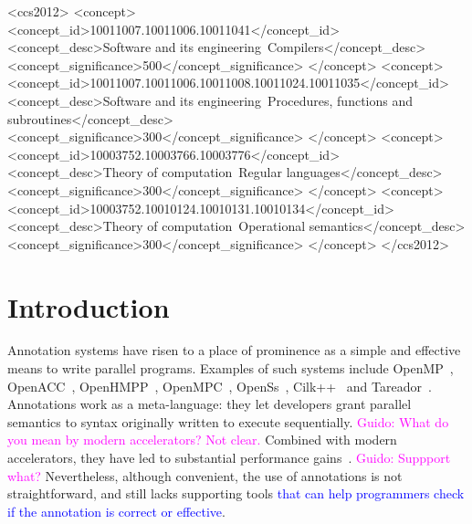 \documentclass[sigplan,10pt,review,anonymous]{acmart}
\newcommand{\guido}[1]{\noindent\textcolor{magenta}{Guido: {#1}}}
\newcommand{\new}[1]{\noindent\textcolor{blue}{ {#1}}}
\newcommand{\guido}[1]{}
\newcommand{\new}[1]{#1}
\begin{document}
 \begin{CCSXML}
<ccs2012>
<concept>
<concept_id>10011007.10011006.10011041</concept_id>
<concept_desc>Software and its engineering~Compilers</concept_desc>
<concept_significance>500</concept_significance>
</concept>
<concept>
<concept_id>10011007.10011006.10011008.10011024.10011035</concept_id>
<concept_desc>Software and its engineering~Procedures, functions and subroutines</concept_desc>
<concept_significance>300</concept_significance>
</concept>
<concept>
<concept_id>10003752.10003766.10003776</concept_id>
<concept_desc>Theory of computation~Regular languages</concept_desc>
<concept_significance>300</concept_significance>
</concept>
<concept>
<concept_id>10003752.10010124.10010131.10010134</concept_id>
<concept_desc>Theory of computation~Operational semantics</concept_desc>
<concept_significance>300</concept_significance>
</concept>
</ccs2012>
\end{CCSXML}



\maketitle

\section{Introduction}
\label{sec:intro}

Annotation systems have risen to a place of prominence as a simple and
effective means to write parallel programs.
Examples of such systems include OpenMP~\cite{JaegerCP15},
OpenACC~\cite{OpenACC20}, OpenHMPP~\cite{Andion14}, OpenMPC~\cite{Lee10},
OpenSs~\cite{MeenderinckJ11}, Cilk++~\cite{Leiserson09} and
Tareador~\cite{Ayguade15}.
Annotations work as a meta-language: they let developers grant parallel
semantics to syntax originally written to execute sequentially.
\guido{What do you mean by modern accelerators? Not clear.}
Combined with modern accelerators, they have led to substantial performance
gains~\cite{Bertolli14,Mendonca17,Poesia17,Reyes12,Wienke12}.
\guido{Suppport what?}
Nevertheless, although convenient, the use of annotations is not straightforward, and
still lacks supporting tools \new{that can help programmers check if the annotation is
correct or effective}.
\end{document}
